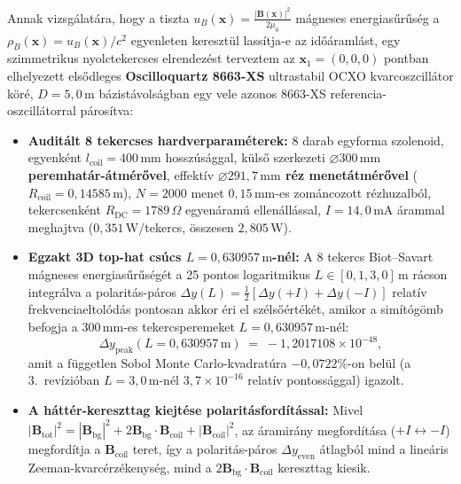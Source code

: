 \par
Annak vizsg\'alat\'ara, hogy a tiszta $u_B(\mathbf{x}) = \frac{|\mathbf{B}(\mathbf{x})|^2}{2\mu_0}$ m\'agneses energias\H{u}r\H{u}s\'eg a $\rho_B(\mathbf{x}) = u_B(\mathbf{x})/c^2$ egyenleten kereszt\"ul lass\'itja-e az id\H{o}\'araml\'ast, egy szimmetrikus nyolctekercses elrendez\'est terveztem az $\mathbf{x}_1 = (0,0,0)$ pontban elhelyezett els\H{o}dleges \textbf{Oscilloquartz 8663-XS} ultrastabil OCXO kvarcoszcill\'ator k\"or\'e, $D = 5{,}0\,\text{m}$ b\'azist\'avols\'agban egy vele azonos 8663-XS referencia-oszcill\'atorral p\'aros\'itva:
\begin{itemize}\setlength{\itemsep}{1pt}\setlength{\parskip}{0pt}\setlength{\topsep}{1pt}
  \item \textbf{Audit\'alt 8 tekercses hardverparam\'eterek:} 8 darab egyforma szolenoid, egyenk\'ent $l_{\text{coil}} = 400\,\text{mm}$ hossz\'us\'aggal, k\"uls\H{o} szerkezeti \textbf{$\varnothing 300\,\text{mm}$ peremhat\'ar-\'atm\'er\H{o}vel}, effekt\'iv \textbf{$\varnothing 291{,}7\,\text{mm}$ r\'ez menet\'atm\'er\H{o}vel} ($R_{\text{coil}} = 0{,}14585\,\text{m}$), $N = 2000$ menet $0{,}15\,\text{mm}$-es zom\'ancozott r\'ezhuzalb\'ol, tekercsenk\'ent $R_{\text{DC}} = 1789\,\Omega$ egyen\'aram\'u ellen\'all\'assal, $I = 14{,}0\,\text{mA}$ \'arammal meghajtva ($0{,}351\,\text{W}$/tekercs, \"osszesen $2{,}805\,\text{W}$).
  \item \textbf{Egzakt 3D top-hat cs\'ucs $L = 0{,}630957\,\text{m}$-n\'el:} A 8 tekercs Biot--Savart m\'agneses energias\H{u}r\H{u}s\'eg\'et a 25 pontos logaritmikus $L \in [0{,}1, 3{,}0]\,\text{m}$ r\'acson integr\'alva a polarit\'as-p\'aros $\Delta y(L) = \frac{1}{2}[\Delta y(+I) + \Delta y(-I)]$ relat\'iv frekvenciaeltol\'od\'as pontosan akkor \'eri el sz\'els\H{o}\'ert\'ek\'et, amikor a sim\'it\'og\"omb befogja a $300\,\text{mm}$-es tekercsperemeket \textbf{$L = 0{,}630957\,\text{m}$}-n\'el:
  \begin{equation}
    \Delta y_{\text{peak}}(L = 0{,}630957\,\text{m}) \;=\; -1{,}2017108\times 10^{-48},
  \end{equation}
  amit a f\"uggetlen Sobol Monte Carlo-kvadrat\'ura $-0{,}0722\%$-on bel\"ul (a 3.\ rev\'izi\'oban $L = 3{,}0\,\text{m}$-n\'el $3{,}7\times 10^{-16}$ relat\'iv pontoss\'aggal) igazolt.
  \item \textbf{A h\'att\'er-kereszttag kiejt\'ese polarit\'asford\'it\'assal:} Mivel $|\mathbf{B}_{\text{tot}}|^2 = |\mathbf{B}_{\text{bg}}|^2 + 2\mathbf{B}_{\text{bg}}\cdot\mathbf{B}_{\text{coil}} + |\mathbf{B}_{\text{coil}}|^2$, az \'aramir\'any megford\'it\'asa ($+I \leftrightarrow -I$) megford\'itja a $\mathbf{B}_{\text{coil}}$ teret, \'igy a polarit\'as-p\'aros $\Delta y_{\text{even}}$ \'atlagb\'ol mind a line\'aris Zeeman-kvarc\'erz\'ekenys\'eg, mind a $2\mathbf{B}_{\text{bg}}\cdot\mathbf{B}_{\text{coil}}$ kereszttag kiesik.
\end{itemize}

